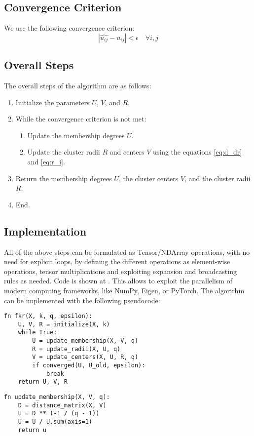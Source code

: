 \documentclass[conference]{IEEEtran}
\begin{document}
\subsection{Convergence Criterion}
We use the following convergence criterion:
\begin{equation}
|\hat{u_{ij}} - u_{ij}| < \epsilon \quad \forall i, j
\end{equation}

\subsection{Overall Steps}
The overall steps of the algorithm are as follows:
\begin{enumerate}
    \item Initialize the parameters $U$, $V$, and $R$.
    \item While the convergence criterion is not met:
    \begin{enumerate}
        \item Update the membership degrees $U$.
        \item Update the cluster radii $R$ and centers $V$ using the equations \eqref{eq:d_dr} and \eqref{eq:r_i}.
    \end{enumerate}
    \item Return the membership degrees $U$, the cluster centers $V$, and the cluster radii $R$.
    \item End.
\end{enumerate}

\subsection{Implementation}
All of the above steps can be formulated as Tensor/NDArray operations, with no need for explicit loops,
by defining the different operations as element-wise operations, tensor multiplications and exploiting
expansion and broadcasting rules as needed. Code is shown at \cite{b1}.
This allows to exploit the parallelism of modern computing frameworks, like NumPy, Eigen, or PyTorch.
The algorithm can be implemented with the following pseudocode:
\begin{verbatim}
fn fkr(X, k, q, epsilon):
    U, V, R = initialize(X, k)
    while True:
        U = update_membership(X, V, q)
        R = update_radii(X, U, q)
        V = update_centers(X, U, R, q)
        if converged(U, U_old, epsilon):
            break
    return U, V, R
\end{verbatim}
\begin{verbatim}
fn update_membership(X, V, q):
    D = distance_matrix(X, V)
    U = D ** (-1 / (q - 1))
    U = U / U.sum(axis=1)
    return u
\end{verbatim}
\end{document}
